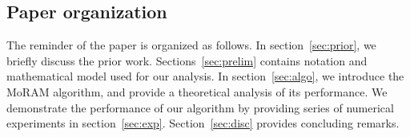 \subsection{Paper organization}
The reminder of the paper is organized as follows. In section~\ref{sec:prior}, we briefly discuss the prior work. Sections~\ref{sec:prelim} contains notation and mathematical model used for our analysis. In section~\ref{sec:algo}, we introduce the MoRAM algorithm, and provide a theoretical analysis of its performance. We demonstrate the performance of our algorithm by providing series of numerical experiments in section~\ref{sec:exp}. Section~\ref{sec:disc} provides concluding remarks.